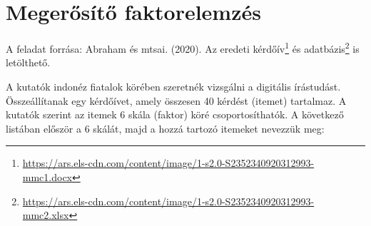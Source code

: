 \documentclass[
  letterpaper,
]{krantz}
\renewcommand{\href}[2]{#2\footnote{\url{#1}}}
\begin{document}
\hypertarget{megerux151suxedtux151-faktorelemzuxe9s}{%
\chapter{Megerősítő
faktorelemzés}\label{megerux151suxedtux151-faktorelemzuxe9s}}

A feladat forrása: Abraham és mtsai. (2020). Az eredeti
\href{https://ars.els-cdn.com/content/image/1-s2.0-S2352340920312993-mmc1.docx}{kérdőív}
és
\href{https://ars.els-cdn.com/content/image/1-s2.0-S2352340920312993-mmc2.xlsx}{adatbázis}
is letölthető.

A kutatók indonéz fiatalok körében szeretnék vizsgálni a digitális
írástudást. Összeállítanak egy kérdőívet, amely összesen 40 kérdést
(itemet) tartalmaz. A kutatók szerint az itemek 6 skála (faktor) köré
csoportosíthatók. A következő listában először a 6 skálát, majd a hozzá
tartozó itemeket nevezzük meg:
\end{document}
